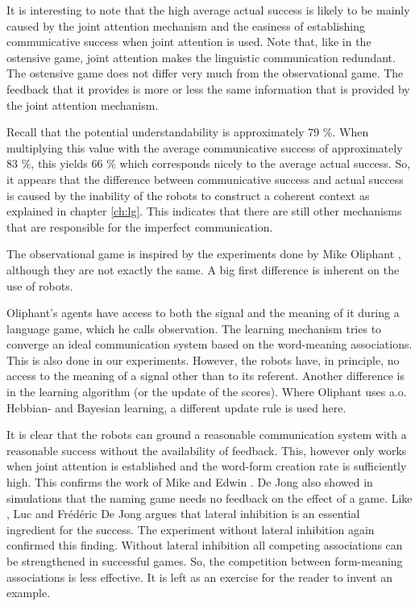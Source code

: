 It is interesting to note that the high average actual success is likely to be mainly caused by the joint attention mechanism and the easiness of establishing communicative success when joint attention is used. Note that, like in the ostensive game, joint attention makes the linguistic communication redundant. The ostensive game does not differ very much from the observational game. The feedback that it provides is more or less the same information that is provided by the joint attention mechanism.

Recall that the potential understandability is approximately 79 \%. When multiplying this value with the average communicative success of approximately 83 \%, this yields 66 \% which corresponds nicely to the average actual success. So, it appears that the difference between communicative success and actual success is caused by the inability of the robots to construct a coherent context as explained in chapter \ref{ch:lg}. This indicates that there are still other mechanisms that are responsible for the imperfect communication.


The observational game is inspired by the experiments done by Mike Oliphant \citep{oliphant:1997,oliphant:1998,oliphant:2000}, although they are not exactly the same. A big first difference is inherent on the use of robots. 

Oliphant's agents have access to both the signal and the meaning of it during a language game, which he calls observation. The learning mechanism tries to converge an ideal communication system based on the word-meaning associations. This is also done in our experiments. However, the robots have, in principle, no access to the meaning of a signal other than to its referent. Another difference is in the learning algorithm (or the update of the scores). Where Oliphant uses a.o. Hebbian- and Bayesian learning, a different update rule is used here.

It is clear that the robots can ground a reasonable communication system with a reasonable success without the availability of feedback. This, however only works when joint attention is established and the word-form creation rate is sufficiently high. This confirms the work of Mike \citet{oliphant:1997} and Edwin \citet{dejong:2000}. De Jong also showed in simulations that the naming game needs no feedback on the effect of a game. Like \citet{oliphant:1997}, Luc \citet{steels:2000} and Fr\'ed\'eric \citet{kaplan:2000} De Jong argues that lateral inhibition is an essential ingredient for the success. The experiment without lateral inhibition again confirmed this finding. Without lateral inhibition all competing associations can be strengthened in successful games. So, the competition between form-meaning associations is less effective. It is left as an exercise for the reader to invent an example.

